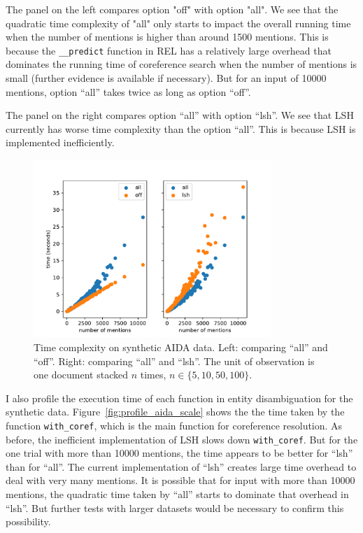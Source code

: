 \documentclass[a4paper,11pt]{article}
\numberwithin{equation}{section} %
\begin{document}
The panel on the left compares option "off" with option "all". We see that the quadratic time complexity of "all" only starts to impact the overall running time when the number of mentions is higher than around 1500 mentions. This is because the \verb|__predict| function in REL has a relatively large overhead that dominates the running time of coreference search when the number of mentions is small (further evidence is available if necessary). But for an input of 10000 mentions, option ``all'' takes twice as long as option ``off''. 

The panel on the right compares option ``all'' with option ``lsh''. We see that LSH currently has worse time complexity than the option ``all''. This is because LSH is implemented inefficiently.

\begin{figure}[H]
  \centering
  \includegraphics[width = 0.8\textwidth]{../figs/timing_aida_scale.pdf}
  \caption{Time complexity on synthetic AIDA data. Left: comparing ``all'' and ``off''. Right: comparing ``all'' and ``lsh''. The unit of observation is one document stacked $n$ times, 
  $n \in \{5, 10, 50, 100\}$.}
  \label{fig:timing_aida_scale}
\end{figure}

I also profile the execution time of each function in entity disambiguation for the synthetic data. Figure~\ref{fig:profile_aida_scale} shows the the time taken by the function \verb|with_coref|, which is the main function for coreference resolution. As before, the inefficient implementation of LSH slows down 
\verb|with_coref|. But for the one trial with more than 10000 mentions, the time appears to be better for ``lsh'' than for ``all''.
The current implementation of ``lsh'' creates large time overhead to deal with very many mentions. It is possible that for input with more than 10000 mentions, the quadratic time taken by ``all'' starts to dominate that overhead in ``lsh''. But further tests with larger datasets would be necessary to confirm this possibility.
\end{document}
